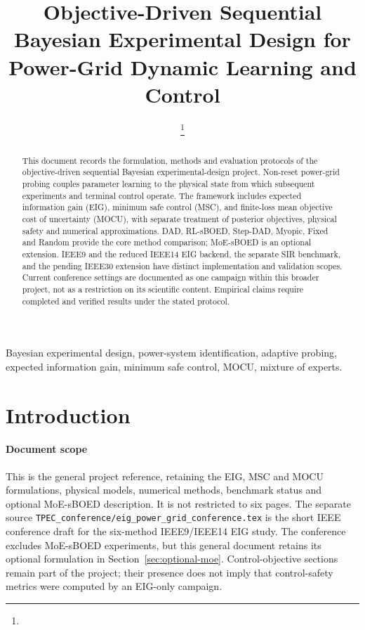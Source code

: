 \documentclass[journal]{IEEEtran}
\title{Objective-Driven Sequential Bayesian Experimental Design for
Power-Grid Dynamic Learning and Control}
\author{\todo{Authors and affiliations}%
\thanks{\todo{Funding and corresponding-author information.}}}
\begin{document}
\maketitle

\begin{abstract}
This document records the formulation, methods and evaluation protocols of
the objective-driven sequential Bayesian experimental-design project.
Non-reset power-grid probing couples parameter learning to the physical
state from which subsequent experiments and terminal control operate.
The framework includes expected information gain (EIG), minimum safe control
(MSC), and finite-loss mean objective cost of uncertainty (MOCU), with
separate treatment of posterior objectives, physical safety and numerical
approximations. DAD, RL-sBOED, Step-DAD, Myopic, Fixed and Random provide the
core method comparison; MoE-sBOED is an optional extension. IEEE9 and the
reduced IEEE14 EIG backend, the separate SIR benchmark, and the pending
IEEE30 extension have distinct implementation and validation scopes.
Current conference settings are documented as one campaign within this
broader project, not as a restriction on its scientific content. Empirical
claims require completed and verified results under the stated protocol.
\end{abstract}
\begin{IEEEkeywords}
Bayesian experimental design, power-system identification, adaptive probing,
expected information gain, minimum safe control, MOCU, mixture of experts.
\end{IEEEkeywords}

\section{Introduction}
\label{sec:introduction}
\paragraph{Document scope}
This is the general project reference, retaining the EIG, MSC and MOCU
formulations, physical models, numerical methods, benchmark status and
optional MoE-sBOED description. It is not restricted to six pages.
The separate source \texttt{TPEC\_conference/eig\_power\_grid\_conference.tex} is the short
IEEE conference draft for the six-method IEEE9/IEEE14 EIG study.
The conference excludes MoE-sBOED experiments, but this general document
retains its optional formulation in Section~\ref{sec:optional-moe}.
Control-objective sections remain part of the project; their presence does
not imply that control-safety metrics were computed by an EIG-only campaign.
\end{document}

